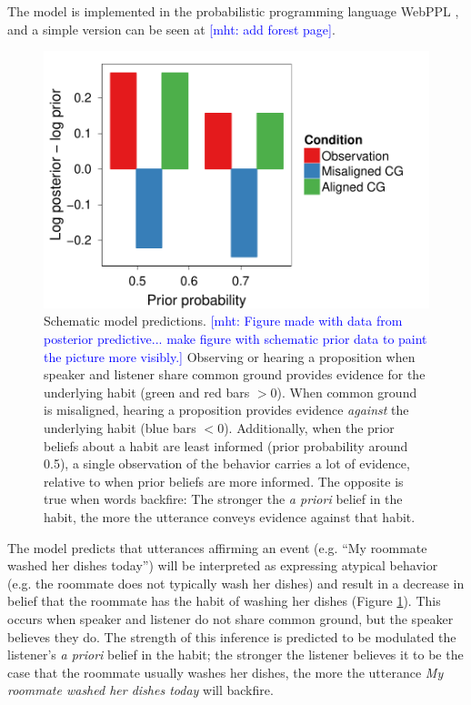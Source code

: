 \documentclass[10pt,letterpaper]{article}
\newcommand{\mht}[1]{\textcolor{Blue}{[mht: #1]}}
\begin{document}
The model is implemented in the probabilistic programming language WebPPL \cite{dippl}, and a simple version can be seen at \mht{add forest page}.


\begin{figure}
\centering
    \includegraphics[width=\columnwidth]{schematic-model}
    \caption{Schematic model predictions.
    \mht{Figure made with data from posterior predictive... make figure with schematic prior data to paint the picture more visibly.}
    Observing or hearing a proposition when speaker and listener share common ground provides evidence for the underlying habit (green and red bars $> 0$). 
    When common ground is misaligned, hearing a proposition provides evidence \emph{against} the underlying habit (blue bars $<0$).
    Additionally, when the prior beliefs about a habit are least informed (prior probability around 0.5), a single observation of the behavior carries a lot of evidence, relative to when prior beliefs are more informed. 
    The opposite is true when words backfire: The stronger the \emph{a priori} belief in the habit, the more the utterance conveys evidence against that habit. }
  \label{fig:schematic-model}
\end{figure}


The model predicts that utterances affirming an event (e.g. ``My roommate washed her dishes today'') will be interpreted as expressing atypical behavior (e.g. the roommate does not typically wash her dishes) and result in a decrease in belief that the roommate has the habit of washing her dishes (Figure \ref{fig:schematic-model}).
This occurs when speaker and listener do not share common ground, but the speaker believes they do.
The strength of this inference is predicted to be modulated the listener's \emph{a priori} belief in the habit; the stronger the listener believes it to be the case that the roommate usually washes her dishes, the more the utterance \emph{My roommate washed her dishes today} will backfire. 
\end{document}
